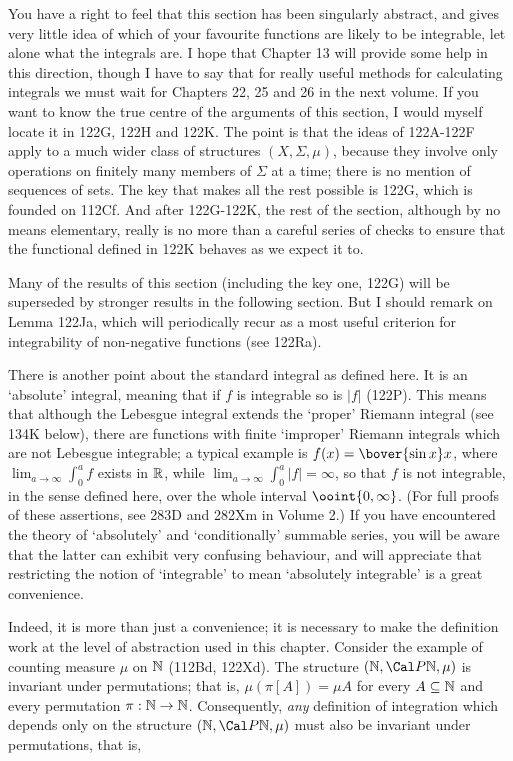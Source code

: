 {You have a right to feel that this section has been singularly
abstract,
and gives very little idea of which of your favourite functions are
likely to be integrable, let alone what the integrals are.   I hope
that
Chapter 13 will provide some help in this direction, though I have to
say that for really useful methods for calculating integrals we must
wait for Chapters 22, 25 and 26 in the next volume.    If you want to
know the true centre of the arguments of this section, I would myself
locate it in 122G, 122H and 122K.   The point is that the ideas of
122A-122F apply to a much wider class of structures $(X,\Sigma,\mu)$,
because they involve only operations on finitely many members of
$\Sigma$ at a time;  there is no mention of sequences of sets.   The
key
that makes all the rest possible is 122G, which is founded on 112Cf.
And after 122G-122K, the rest of the section, although by no means
elementary, really is no more than a careful series of checks to
ensure
that the functional defined in 122K behaves as we expect it to.

Many of the results of this section (including the key one, 122G) will
be superseded by stronger results in the following section.   But I
should remark on Lemma 122Ja, which will periodically recur as a most
useful criterion for integrability of non-negative functions (see
122Ra).

There is another point about the standard integral as defined here.   It
is an `absolute' integral, meaning that if $f$ is integrable so is
$|f|$ (122P).   This means that although the Lebesgue integral extends
the `proper' Riemann integral (see 134K below), there are functions
with
finite `improper' Riemann integrals which are not Lebesgue integrable;
a typical example is $f(x)=\bover{\sin x}x$, where
$\lim_{a\to\infty}\int_0^af$ exists in $\Bbb R$, while
$\lim_{a\to\infty}\int_0^a|f|=\infty$, so that $f$ is not integrable,
in the sense defined here, over the whole interval $\ooint{0,\infty}$.
(For full proofs of these assertions, see 283D and 282Xm in Volume
2.)   If you have encountered the theory of `absolutely' and
`conditionally'
summable series, you will be aware that the latter can exhibit very
confusing behaviour, and will appreciate that restricting the notion of
`integrable' to mean `absolutely integrable' is a great convenience.

Indeed, it is more than just a convenience;  it is necessary to make the
definition work at the level of abstraction used in this chapter.
Consider the example of counting measure $\mu$ on $\Bbb N$ (112Bd,
122Xd).   The structure $(\Bbb N,\Cal P\Bbb N,\mu)$ is invariant under
permutations;
that is, $\mu(\pi[A])=\mu A$ for every $A\subseteq\Bbb N$ and every
permutation $\pi:\Bbb N\to\Bbb N$.   Consequently, {\it any} definition
of integration which depends only on the structure
$(\Bbb N,\Cal P\Bbb N,\mu)$ must also be invariant under
permutations, that is,

}
